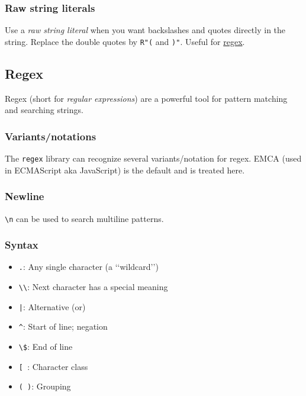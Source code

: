 \documentclass[8pt, table, xcdraw]{article}%
\begin{document}
\subsubsection{Raw string literals}

Use a \emph{raw string literal} when you want backslashes and quotes directly in the string. Replace the double quotes by \lstinline{R"(} and \lstinline{)"}. Useful for \hyperref[regex]{regex}.

\subsection{Regex} \label{regex}

Regex (short for \emph{regular expressions}) are a powerful tool for pattern matching and searching strings.

\subsubsection{Variants/notations}

The \lstinline{regex} library can recognize several variants/notation for regex. EMCA (used in ECMAScript aka JavaScript) is the default and is treated here.

\subsubsection{Newline}

 \lstinline{\n} can be used to search multiline patterns.

\subsubsection{Syntax}

\begin{itemize}
    \item \lstinline{.}: Any single character (a ‘‘wildcard’’)
    \item \lstinline{\\}: Next character has a special meaning
    \item \lstinline{|}: Alternative (or)
    \item \lstinline{^}: Start of line; negation
    \item \lstinline{\$}: End of line
    \item \lstinline{[ }: Character class
    \item \lstinline{( )}: Grouping
\end{itemize}
\end{document}
